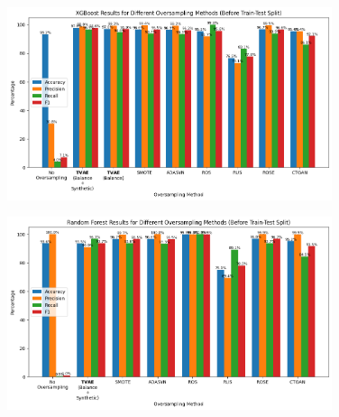 \documentclass[twoside,11pt]{article}
\begin{document}
\begin{figure}
  \centering
  \includegraphics[width=0.85\textwidth]{images/xgboost_oversample_before_split.png}
  \caption{}
  \label{fig:xgboost_oversample_before_split}
\end{figure}

\begin{figure}
  \centering
  \includegraphics[width=0.85\textwidth]{images/rf_oversample_before_slit.png}
  \caption{}
  \label{fig:rf_oversample_before_split}
\end{figure}
\end{document}

